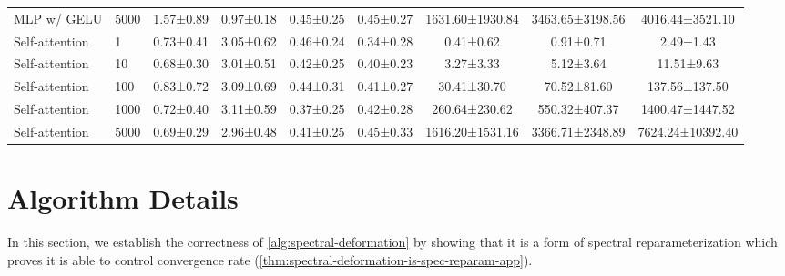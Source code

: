 \documentclass{article}
\theoremstyle{plain}
\theoremstyle{definition}
\theoremstyle{remark}
\begin{document}
\begin{table}
{\begin{tabular}{llccccccc}
MLP w/ GELU & 5000 & 1.57{\tiny ±0.89} & 0.97{\tiny ±0.18} & 0.45{\tiny ±0.25} & 0.45{\tiny ±0.27} & 1631.60{\tiny ±1930.84} & 3463.65{\tiny ±3198.56} & 4016.44{\tiny ±3521.10} \\
Self-attention & 1 & 0.73{\tiny ±0.41} & 3.05{\tiny ±0.62} & 0.46{\tiny ±0.24} & 0.34{\tiny ±0.28} & 0.41{\tiny ±0.62} & 0.91{\tiny ±0.71} & 2.49{\tiny ±1.43} \\
Self-attention & 10 & 0.68{\tiny ±0.30} & 3.01{\tiny ±0.51} & 0.42{\tiny ±0.25} & 0.40{\tiny ±0.23} & 3.27{\tiny ±3.33} & 5.12{\tiny ±3.64} & 11.51{\tiny ±9.63} \\
Self-attention & 100 & 0.83{\tiny ±0.72} & 3.09{\tiny ±0.69} & 0.44{\tiny ±0.31} & 0.41{\tiny ±0.27} & 30.41{\tiny ±30.70} & 70.52{\tiny ±81.60} & 137.56{\tiny ±137.50} \\
Self-attention & 1000 & 0.72{\tiny ±0.40} & 3.11{\tiny ±0.59} & 0.37{\tiny ±0.25} & 0.42{\tiny ±0.28} & 260.64{\tiny ±230.62} & 550.32{\tiny ±407.37} & 1400.47{\tiny ±1447.52} \\
Self-attention & 5000 & 0.69{\tiny ±0.29} & 2.96{\tiny ±0.48} & 0.41{\tiny ±0.25} & 0.45{\tiny ±0.33} & 1616.20{\tiny ±1531.16} & 3366.71{\tiny ±2348.89} & 7624.24{\tiny ±10392.40} \\
\bottomrule
\end{tabular}
}
\end{table}
\clearpage
\section{Algorithm Details}
\label{app:algorithm-details}
In this section, we establish the correctness of \cref{alg:spectral-deformation} by showing that it is a form of spectral reparameterization which proves it is able to control convergence rate (\cref{thm:spectral-deformation-is-spec-reparam-app}).
\end{document}
